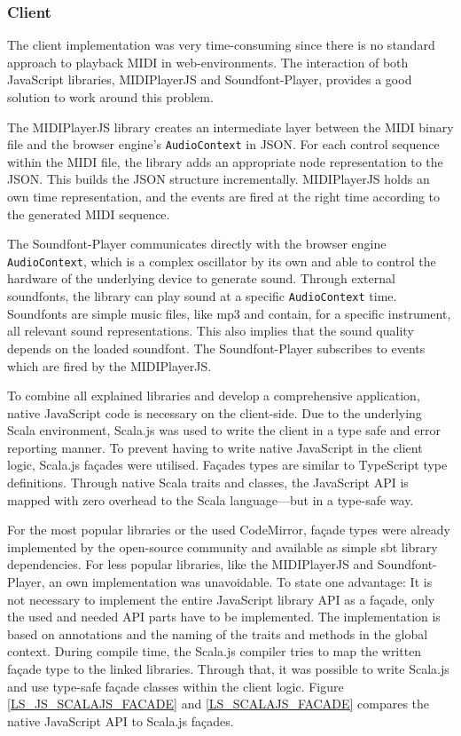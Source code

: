 \subsubsection{Client}
\label{IMPL_SCALALAKATA_CSMODEL_CLIENT}
The client implementation was very time-consuming since there is no standard approach to playback MIDI in web-environments. The interaction of both JavaScript libraries, MIDIPlayerJS and Soundfont-Player, provides a good solution to work around this problem.

The MIDIPlayerJS library creates an intermediate layer between the MIDI binary file and the browser engine's \texttt{AudioContext} in JSON. For each control sequence within the MIDI file, the library adds an appropriate node representation to the JSON. This builds the JSON structure incrementally. MIDIPlayerJS holds an own time representation, and the events are fired at the right time according to the generated MIDI sequence.

The Soundfont-Player communicates directly with the browser engine \texttt{AudioContext}, which is a complex oscillator by its own and able to control the hardware of the underlying device to generate sound. Through external soundfonts, the library can play sound at a specific \texttt{AudioContext} time. Soundfonts are simple music files, like mp3 and contain, for a specific instrument, all relevant sound representations. This also implies that the sound quality depends on the loaded soundfont. The Soundfont-Player subscribes to events which are fired by the MIDIPlayerJS.

To combine all explained libraries and develop a comprehensive application, native JavaScript code is necessary on the client-side. Due to the underlying Scala environment, Scala.js was used to write the client in a type safe and error reporting manner. To prevent having to write native JavaScript in the client logic, Scala.js façades were utilised. Façades types are similar to TypeScript type definitions. Through native Scala traits and classes, the JavaScript API is mapped with zero overhead to the Scala language—but in a type-safe way.\cite{ScJsDoc}

For the most popular libraries or the used CodeMirror, façade types were already implemented by the open-source community and available as simple sbt library dependencies. For less popular libraries, like the MIDIPlayerJS and Soundfont-Player, an own implementation was unavoidable. To state one advantage: It is not necessary to implement the entire JavaScript library API as a façade, only the used and needed API parts have to be implemented. The implementation is based on annotations and the naming of the traits and methods in the global context. During compile time, the Scala.js compiler tries to map the written façade type to the linked libraries. Through that, it was possible to write Scala.js and use type-safe façade classes within the client logic. Figure \ref{LS_JS_SCALAJS_FACADE} and \ref{LS_SCALAJS_FACADE} compares the native JavaScript API to Scala.js façades.

